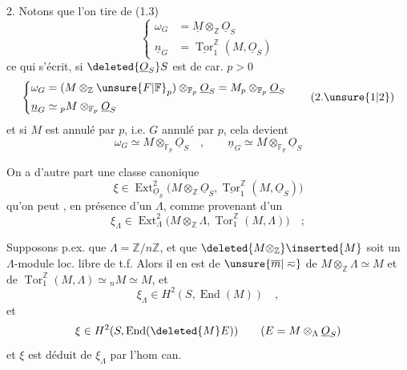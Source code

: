 2. Notons que  l'on tire de (1.3)
\[
\left\{\begin{aligned}
\omega_{G}&=\underline{M}\otimes_{\mathbb Z}\underline{O}_S\\
\underline{n}_G&=\underline{\operatorname{Tor}}^{\mathbb Z}_1(M,\underline{O}_S)
\end{aligned}\right.\tag*{(2.1)}
\]
ce qui s'écrit, si $\deleted{\underline{O}_S}S$ est de car. $p>0$
\[
\left\{\begin{aligned}
\omega_G&=(M\otimes_{\mathbb Z}\unsure{F|\mathbb F}_p)\otimes_{\mathbb F_p}\underline{O}_S=M_p\otimes_{\mathbb F_p}\underline{O}_S\\
\underline{n}_G&\simeq {}_pM\otimes_{\mathbb F_p}\underline{O}_S
\end{aligned}\right.\tag*{(2.\unsure{1|2})}
\]
et si $M$ est annulé par $p$, i.e. $G$ annulé par $p$, cela devient
\[
\omega_G\simeq M\otimes_{\mathbb F_p}\underline{O}_S
\quad ,\qquad \underline{n}_G\simeq M\otimes_{\mathbb F_p}\underline{O}_S
\tag*{$(2.2')$}
\]

On a d'autre part une classe canonique
\[
\xi\in\operatorname{Ext}_{\underline{O}_S}^{2}\bigl(M\otimes_{\mathbb Z}\underline{O}_S,\underline{\operatorname{Tor}}^{\mathbb Z}_1(M,\underline{O}_S)\bigr)
\]
qu'on peut , en présence d'un $\Lambda$, comme provenant d'un
\[
\xi_{\Lambda}\in\operatorname{Ext}_{\Lambda}^{2}\bigl(M\otimes_{\mathbb Z}\Lambda,\operatorname{Tor}^{\mathbb Z}_1(M,\Lambda)\bigr)\quad ;
\]

Supposons p.ex. que $\Lambda=\mathbb Z/n\mathbb Z$, et que $\deleted{M\otimes_{\mathbb Z}}\inserted{M}$ soit un $\Lambda$-module loc. libre de t.f. Alors il en est de $\unsure{\overline{m}|\eqsim}$ de $M\otimes_{\mathbb Z}\Lambda\simeq M$ et de $\operatorname{Tor}^{\mathbb Z}_1(M,\Lambda)\simeq {}_nM\simeq M$, et
\[
\xi_{\Lambda}\in H^2(S,\operatorname{End}(M))\quad ,
\]
et 
\[
\xi\in H^2(S,\operatorname{End}(\deleted{M}E))\qquad (E=M\otimes_{\Lambda}\underline{O}_S)
\]
et $\xi$ est déduit de $\xi_{\Lambda}$ par l'hom can.
